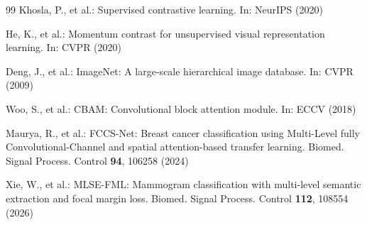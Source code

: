 \documentclass[runningheads]{llncs}
\begin{document}
\begin{thebibliography}{99}
Khosla, P., et al.: Supervised contrastive learning. In: NeurIPS (2020)

He, K., et al.: Momentum contrast for unsupervised visual representation learning. In: CVPR (2020)

Deng, J., et al.: ImageNet: A large-scale hierarchical image database. In: CVPR (2009)

Woo, S., et al.: CBAM: Convolutional block attention module. In: ECCV (2018)

Maurya, R., et al.: FCCS-Net: Breast cancer classification using Multi-Level fully Convolutional-Channel and spatial attention-based transfer learning. Biomed. Signal Process. Control \textbf{94}, 106258 (2024)

Xie, W., et al.: MLSE-FML: Mammogram classification with multi-level semantic extraction and focal margin loss. Biomed. Signal Process. Control \textbf{112}, 108554 (2026)

\end{thebibliography}
\end{document}
